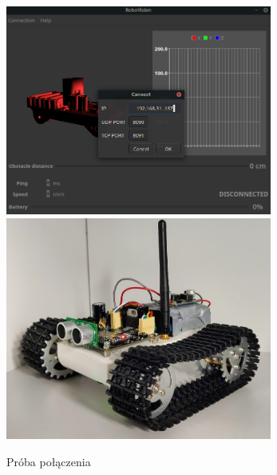 \documentclass[12pt,a4paper,polish]{article}
\begin{document}
  \begin{figure}[ht]
    \centering
    \includegraphics[width=0.78\textwidth]{img/final/0.png}
    \includegraphics[width=0.78\textwidth]{img/final/0e.jpg}
    \caption{Próba połączenia}
  \end{figure}
\end{document}
